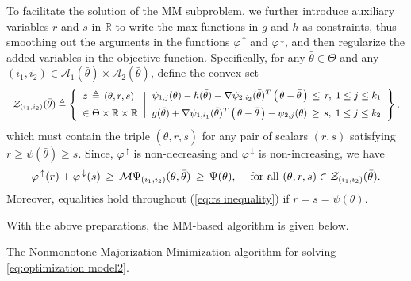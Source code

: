 \documentclass{siamart}
\newcommand{\epc}{\hspace{1pc}}
\begin{document}
To facilitate the solution of the MM subproblem, we further introduce auxiliary variables $r$ and $s$ in $\mathbb{R}$
to write the max functions in $g$ and $h$ as constraints, thus smoothing out the arguments in the functions
$\varphi^{\, \uparrow}$ and $\varphi^{\, \downarrow}$, and then regularize the added variables in the objective function.
Specifically, for any $\bar{\theta}\in \Theta$ and any $(i_1, i_2)\in \mathcal{A}_1( \bar{\theta} )\times \mathcal{A}_2( \bar{\theta} )$, define the convex set
$$
{\small \begin{array}{ll}
{\cal Z}_{(i_1,i_2)}( \bar{\theta} )  \triangleq  \left\{ \begin{array}{ll}
z \, \triangleq \, (\theta, r,s) \\ [5pt]
\in  \Theta\times \mathbb{R}\times \mathbb{R}
\end{array}
 \bigg|  \begin{array}{ll}
 \psi_{1,j}(\theta) - h( \bar{\theta} ) - \nabla \psi_{2,i_2}( \bar{\theta} )^T \left( \, \theta - \bar{\theta} \, \right)
\, \leq \, r,\; 1\leq j\leq k_1 \\ [5pt]
 g( \bar{\theta} ) + \nabla \psi_{1, i_1}( \bar{\theta} )^T \left( \, \theta - \bar{\theta} \, \right) - \psi_{2,j}(\theta) \, \geq \,s,
\; 1\leq j\leq k_2
\end{array}
\right\},
\end{array}}
$$
which must contain the triple $( \bar{\theta},r,s )$ for any pair of scalars $(r,s)$ satisfying $r \geq \psi(\bar{\theta}) \geq s$.
Since, $\varphi^{\, \uparrow}$ is non-decreasing and $\varphi^{\, \downarrow}$ is non-increasing, we have
\begin{equation} \label{eq:rs inequality}
\varphi^{\, \uparrow}(r) + \varphi^{\, \downarrow}(s) \, \geq \,
{\cal M}\Psi_{(i_1,i_2)}(\theta,\bar{\theta}) \, \geq \,
\Psi(\theta), \epc \mbox{for all $( \theta,r,s ) \in {\cal Z}_{(i_1,i_2)}( \bar{\theta} )$}.
\end{equation}
Moreover, equalities hold throughout (\ref{eq:rs inequality}) if $r = s = \psi(\theta)$.



With the above preparations, the MM-based algorithm is given below.



\noindent\makebox[\linewidth]{\rule{\textwidth}{1pt}}

\noindent The Nonmonotone Majorization-Minimization algorithm for solving \eqref{eq:optimization model2}.

\noindent\makebox[\linewidth]{\rule{\textwidth}{1pt}}
\end{document}

